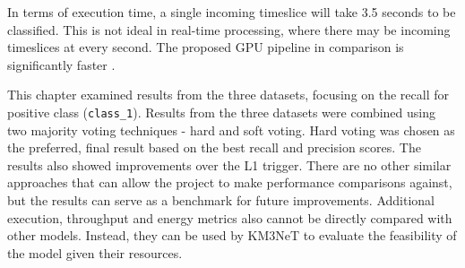 In terms of execution time, a single incoming timeslice will take 3.5 seconds to be classified. This is not ideal in real-time processing, where there may be incoming timeslices at every second. The proposed GPU pipeline in comparison is significantly faster \cite{karas_2019}.

This chapter examined results from the three datasets, focusing on the recall for positive class (\texttt{class\_1}). Results from the three datasets were combined using two majority voting techniques - hard and soft voting. Hard voting was chosen as the preferred, final result based on the best recall and precision scores. The results also showed improvements over the L1 trigger. There are no other similar approaches that can allow the project to make performance comparisons against, but the results can serve as a benchmark for future improvements. Additional execution, throughput and energy metrics also cannot be directly compared with other models. Instead, they can be used by KM3NeT to evaluate the feasibility of the model given their resources. 

\let\cleardoublepage\clearpage